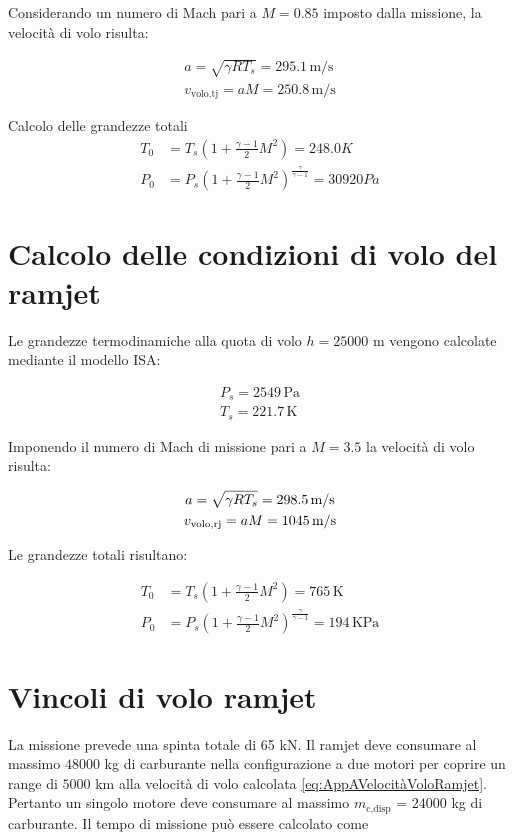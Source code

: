 Considerando un numero di Mach pari a $M =0.85$ imposto dalla missione, la velocità di volo risulta:

\begin{gather*}
    a = \sqrt{\gamma R T_s} = 295.1 \,\text{m/s}\\
    v_{\text{volo,tj}} = aM = 250.8 \,\text{m/s}
\end{gather*}

Calcolo delle grandezze totali
\begin{align*}
    T_{0}  &= T_s \left( 1 + \frac{\gamma-1}{2}M^2\right) = 248.0K \\
    P_{0}   &= P_s\left( 1 + \frac{\gamma-1}{2}M^2\right)^{\frac{\gamma}{\gamma-1}} = 30920Pa 
\end{align*}

\section{Calcolo delle condizioni di volo del ramjet}
Le grandezze termodinamiche alla quota di volo $h = 25000$ m vengono calcolate mediante il modello ISA:

\begin{gather*}
    P_s = 2549 \, \text{Pa}\\
    T_s = 221.7 \,\text{K}
\end{gather*}

Imponendo il numero di Mach di missione pari a $M = 3.5$ la velocità di volo risulta:

\begin{gather}
    a = \sqrt{\gamma R T_s} = 298.5 \,\text{m/s} \notag\\
    v_{\text{volo,rj}} = aM = 1045 \,\text{m/s}
    \label{eq:AppAVelocitàVoloRamjet}
\end{gather}

Le grandezze totali risultano:

\begin{align*}
    T_{0} &= T_s \left( 1 + \frac{\gamma-1}{2}M^2\right)
           = 765 \,\text{K} \\
    P_{0} &= P_s \left( 1 + \frac{\gamma-1}{2}M^2\right)^{\frac{\gamma}{\gamma-1}}
           = 194 \,\text{KPa}
\end{align*}

\section{Vincoli di volo ramjet}

La missione prevede una spinta totale di 65 kN. Il ramjet deve consumare al massimo $48000$ kg di carburante nella configurazione a due motori per coprire un range di $5000$ km alla velocità di volo calcolata \eqref{eq:AppAVelocitàVoloRamjet}. Pertanto un singolo motore deve consumare al massimo $m_{\text{c,disp}}$ = $24000$ kg di carburante.
Il tempo di missione può essere calcolato come

